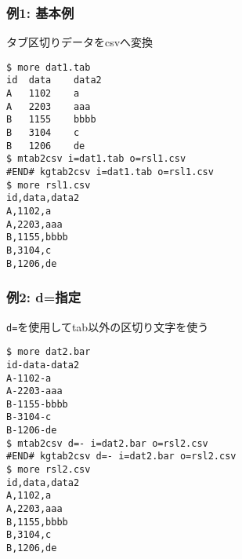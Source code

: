\subsubsection*{例1: 基本例}

 タブ区切りデータをcsvへ変換


\begin{Verbatim}[baselinestretch=0.7,frame=single]
$ more dat1.tab
id	data	data2
A	1102	a
A	2203	aaa
B	1155	bbbb
B	3104	c
B	1206	de
$ mtab2csv i=dat1.tab o=rsl1.csv
#END# kgtab2csv i=dat1.tab o=rsl1.csv
$ more rsl1.csv
id,data,data2
A,1102,a
A,2203,aaa
B,1155,bbbb
B,3104,c
B,1206,de
\end{Verbatim}
\subsubsection*{例2: d=指定}

\verb|d=|を使用してtab以外の区切り文字を使う


\begin{Verbatim}[baselinestretch=0.7,frame=single]
$ more dat2.bar
id-data-data2
A-1102-a
A-2203-aaa
B-1155-bbbb
B-3104-c
B-1206-de
$ mtab2csv d=- i=dat2.bar o=rsl2.csv
#END# kgtab2csv d=- i=dat2.bar o=rsl2.csv
$ more rsl2.csv
id,data,data2
A,1102,a
A,2203,aaa
B,1155,bbbb
B,3104,c
B,1206,de
\end{Verbatim}
